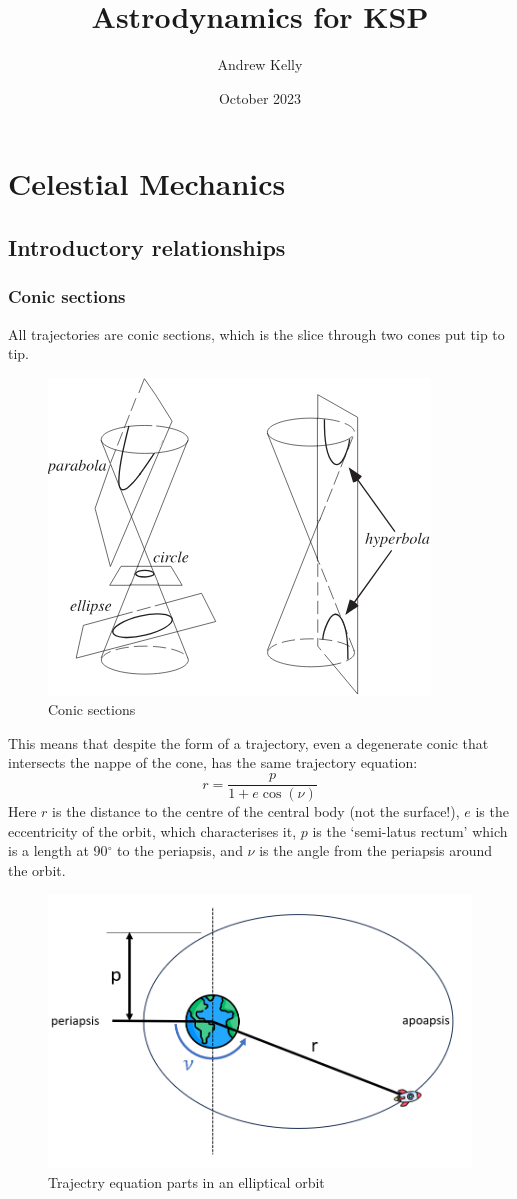 \documentclass{report}
\title{Astrodynamics for KSP}
\author{Andrew Kelly}
\date{October 2023}
\begin{document}
\maketitle
\chapter{Celestial Mechanics}

\section{Introductory relationships}

\subsection{Conic sections}
All trajectories are conic sections, which is the slice through two cones put tip to tip.

\begin{figure}[H]
    \centering
    \includegraphics[width=0.5\linewidth]{Latex Images/ConicSection.png}
    \caption{Conic sections}
    \label{fig:conic}
\end{figure}

This means that despite the form of a trajectory, even a degenerate conic that intersects the nappe of the cone, has the same trajectory equation:
$$
r = \frac{p}{1+e \cos{(\nu)}}
$$
Here $r$ is the distance to the centre of the central body (not the surface!), $e$ is the eccentricity of the orbit, which characterises it, $p$ is the `semi-latus rectum' which is a length at 90$^\circ$ to the periapsis, and $\nu$ is the angle from the periapsis around the orbit.

\begin{figure}[H]
    \centering
    \includegraphics[width=0.7\linewidth]{Latex Images/Ellipse.png}
    \caption{Trajectry equation parts in an elliptical orbit}
    \label{fig:ellipse}
\end{figure}
\end{document}
